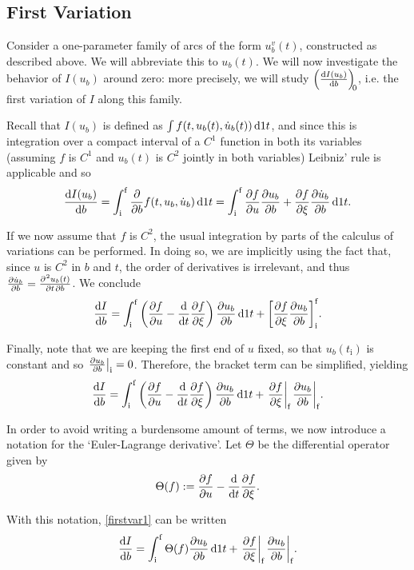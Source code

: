 \documentclass{article}
\theoremstyle{plain}
\theoremstyle{plain}
\theoremstyle{nonumberplain}
\theoremstyle{empty}
\newcommand{\tstart}{\mathrm{i}}
\newcommand{\tend}{\mathrm{f}}
\DeclarePairedDelimiter\eval{.}{\rvert}
\DeclarePairedDelimiter\bracket{[}{]}
\begin{document}
\subsection{First Variation}\label{sec:firstvar}

Consider a one-parameter family of arcs of the form $u_b^v(t)$, constructed as described above. We will abbreviate this to $u_b(t)$. We will now investigate the behavior of $I(u_b)$ around zero: more precisely, we will study $\diff{I(u_b)}b[0]$, i.e. the first variation of $I$ along this family.

Recall that $I(u_b)$ is defined as $\int f(t, u_b(t), \dot u_b(t)) \dl1 t$, and since this is integration over a compact interval of a $C^1$ function in both its variables (assuming $f$ is $C^1$ and $u_b(t)$ is $C^2$ jointly in both variables) Leibniz' rule is applicable and so
\[\diff{I(u_b)}b = \int_\tstart^\tend \diffp*{f(t, u_b, \dot u_b)}b \dl1 t =\int_\tstart^\tend \diffp f u \diffp{u_b}b + \diffp f \xi \diffp{\dot u_b}b \dl1 t.\]

If we now assume that $f$ is $C^2$, the usual integration by parts of the calculus of variations can be performed. In doing so, we are implicitly using the fact that, since $u$ is $C^2$ in $b$ and $t$, the order of derivatives is irrelevant, and thus $\diffp{\dot u_b}b = \diffp{u_b(t)}{t,b}$. We conclude
\[\diff I b = \int_\tstart^\tend \left( \diffp f u - \diff*{\diffp f \xi}t \right) \diffp{u_b}b \dl1 t + \bracket*{ \diffp f \xi \diffp{u_b}b }_\tstart^\tend.\]

Finally, note that we are keeping the first end of $u$ fixed, so that $u_b(t_\tstart)$ is constant and so $\eval*{\diffp{u_b}b}_\tstart = 0$. Therefore, the bracket term can be simplified, yielding
\begin{equation}\label{firstvar1}
\diff I b = \int_\tstart^\tend \left( \diffp f u - \diff*{\diffp f \xi}t \right) \diffp{u_b}b \dl1 t + \eval*{\diffp f \xi}_\tend \eval*{\diffp{u_b}b}_\tend.
\end{equation}

In order to avoid writing a burdensome amount of terms, we now introduce a notation for the `Euler-Lagrange derivative'. Let $\Theta$ be the differential operator given by
\[\Theta(f) := \diffp f u - \diff*{\diffp f \xi}t.\]

With this notation, \eqref{firstvar1} can be written
\begin{equation}\label{firstvar2}
\diff I b = \int_\tstart^\tend \Theta(f) \diffp{u_b}b \dl1 t + \eval*{\diffp f \xi}_\tend \eval*{\diffp{u_b}b}_\tend.
\end{equation}
\end{document}
